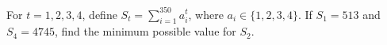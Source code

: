 For $ t = 1, 2, 3, 4$, define $ \displaystyle S_t = \sum_{i = 1}^{350}a_i^t$, where $ a_i \in \{1,2,3,4\}$. If $ S_1 = 513$ and $ S_4 = 4745$, find the minimum possible value for $ S_2$.